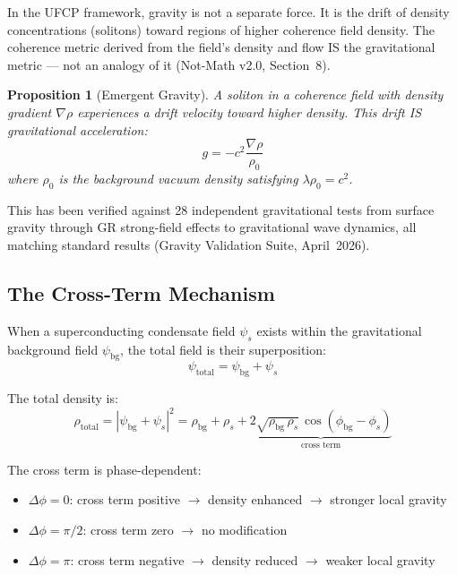\documentclass[11pt, a4paper]{article}
\newtheorem{proposition}{Proposition}[section]
\begin{document}
In the UFCP framework, gravity is not a separate force. It is
the drift of density concentrations (solitons) toward regions
of higher coherence field density. The coherence metric derived
from the field's density and flow IS the gravitational metric
--- not an analogy of it (Not-Math v2.0, Section~8).

\begin{proposition}[Emergent Gravity]
A soliton in a coherence field with density gradient
$\nabla\rho$ experiences a drift velocity toward higher
density. This drift IS gravitational acceleration:
\begin{equation}
  g = -c^2 \frac{\nabla\rho}{\rho_0}
\end{equation}
where $\rho_0$ is the background vacuum density satisfying
$\lambda\rho_0 = c^2$.
\end{proposition}

This has been verified against 28 independent gravitational
tests from surface gravity through GR strong-field effects
to gravitational wave dynamics, all matching standard results
(Gravity Validation Suite, April~2026).

\subsection{The Cross-Term Mechanism}

When a superconducting condensate field $\psi_s$ exists within
the gravitational background field $\psi_{\text{bg}}$, the total
field is their superposition:
\begin{equation}
  \psi_{\text{total}} = \psi_{\text{bg}} + \psi_s
\end{equation}

The total density is:
\begin{equation}
  \rho_{\text{total}} = |\psi_{\text{bg}} + \psi_s|^2
  = \rho_{\text{bg}} + \rho_s
  + \underbrace{2\sqrt{\rho_{\text{bg}}\,\rho_s}\,
    \cos(\phi_{\text{bg}} - \phi_s)}_{\text{cross term}}
  \label{eq:cross-term}
\end{equation}

The cross term is phase-dependent:
\begin{itemize}[nosep]
  \item $\Delta\phi = 0$: cross term positive $\to$ density
        enhanced $\to$ stronger local gravity
  \item $\Delta\phi = \pi/2$: cross term zero $\to$ no
        modification
  \item $\Delta\phi = \pi$: cross term negative $\to$ density
        reduced $\to$ weaker local gravity
\end{itemize}
\end{document}
